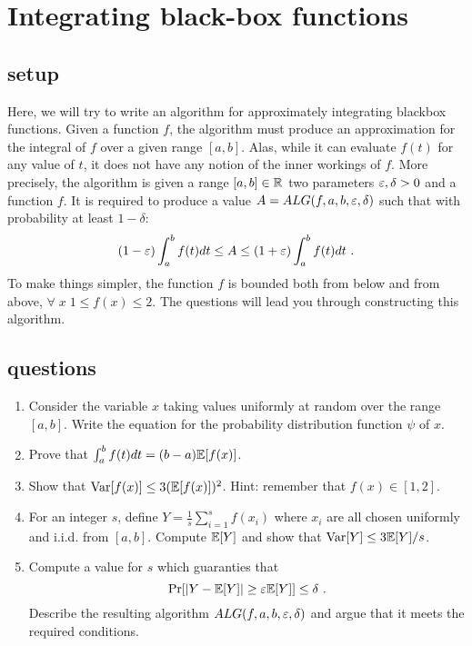 \documentclass{article}
\begin{document}
\section{Integrating black-box functions}
\subsection*{setup}
Here, we will try to write an algorithm for approximately integrating blackbox functions.
Given a function $f$, the algorithm must produce an approximation for the integral of $f$ over a given range $[a,b]$.
Alas, while it can evaluate $f(t)$ for any value of $t$, it does not have any notion of the inner workings of $f$. 
More precisely, the algorithm is given a range $[a,b] \in {\mathbb{R}}$ two parameters $\varepsilon, \delta > 0$ and a function $f$.
It is required to produce a value $A = ALG(f,a,b,\varepsilon,\delta)$ such that with probability at least $1 -\delta$:
\[
 (1-\varepsilon) \int_{a}^{b} f(t)dt \le A \le  (1+\varepsilon) \int_{a}^{b} f(t)dt \ . 
\]
To make things simpler, the function $f$ is bounded both from below and from above, $\forall \; x \; 1 \le f(x) \le 2$.
The questions will lead you through constructing this algorithm.

\subsection*{questions}
\begin{enumerate}
\item Consider the variable $x$ taking values uniformly at random over the range $[a,b]$.
Write the equation for the probability distribution function $\psi$ of $x$. 
\item Prove that $\int_{a}^{b}f(t)dt = (b-a){\mathbb E}[f(x)]$.
\item Show that ${\operatorname{Var}}[f(x)] \le 3 ({\mathbb E}[f(x)])^2$. Hint: remember that $f(x) \in [1,2]$.
\item For an integer $s$, define $Y = \frac{1}{s}\sum_{i=1}^{s}f(x_i)$ where $x_i$ are all chosen uniformly and i.i.d. from $[a,b]$.
Compute ${\mathbb E}[Y]$ and show that ${\operatorname{Var}}[Y] \le 3 {\mathbb E}[Y] /s$.
\item Compute a value for $s$ which guaranties that 
\[
\Pr[ |Y -  {\mathbb E}[Y] | \ge \varepsilon {\mathbb E}[Y]] \le \delta \ .
\]
Describe the resulting algorithm $ALG(f,a,b,\varepsilon,\delta)$ and argue that it meets the required conditions.
\end{enumerate}
\pagebreak

\end{document}
